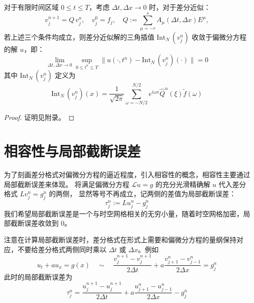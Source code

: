 \begin{theorem}\label{thm:big-thm}
    对于有限时间区域 $0 \le t \le T$，考虑 $\Delta t,\Delta x \to 0$ 时，对于差分近似：
    \[
        v_j^{n+1} = Q\,v_j^n,\quad v_j^0 = f_j,\quad Q := \sum_{\mu = -r}^s A_\mu(\Delta t, \Delta x) E^\mu,
    \]
    若上述三个条件均成立，则差分近似解的三角插值 $\text{Int}_N\,(v_j^n)$ 收敛于偏微分方程的解 $u$，即：
    \[
        \lim_{\Delta t, \Delta x \to 0} \sup_{0 \le t^n \le T} \| u(\cdot,t^n) - \text{Int}_N\,(v_j^n)(\cdot) \| = 0
    \]
    其中 $\text{Int}_N\,(v_j^n)$ 定义为
    \[
        \text{Int}_N\,(v_j^n)(x)  = \frac{1}{\sqrt{2\pi}} \sum_{\omega = -N/2}^{N/2} e^{i \omega  x} \widehat{Q}^n(\xi) \tilde{f}(\omega )
    \]
\end{theorem}

\begin{proof}
    证明见附录。
\end{proof}

\section{相容性与局部截断误差}

为了刻画差分格式对偏微分方程的逼近程度，引入相容性的概念，相容性主要通过局部截断误差来体现。
将满足偏微分方程 $\mathcal{L} u = g$ 的充分光滑精确解 $u$ 代入差分格式 $L v_j^n = g_j^n$ 的两侧，
显然等号不再成立，记两侧的差值为局部截断误差：
\[
    \tau_j^n := L u_j^n - g_j^n
\]
我们希望局部截断误差是一个与时空网格相关的无穷小量，随着时空网格加密，局部截断误差收敛到 $0$。

注意在计算局部截断误差时，差分格式在形式上需要和偏微分方程的量纲保持对应，不要给差分格式两侧同时乘以 $\Delta t$ 或 $\Delta x$。例如
\[
    u_t + a u_x = g(x)
    \quad \sim \quad
    \frac{v_j^{n+1}-v_j^{n+1}}{2\Delta t} + a \frac{v_{j+1}^n-v_{j-1}^n}{2\Delta x} = g_j^n
\]
此时的局部截断误差为
\[
    \tau_j^n = \frac{u_j^{n+1}-u_j^{n+1}}{2\Delta t} + a \frac{u_{j+1}^n-u_{j-1}^n}{2\Delta x} - g_j^n
\]


